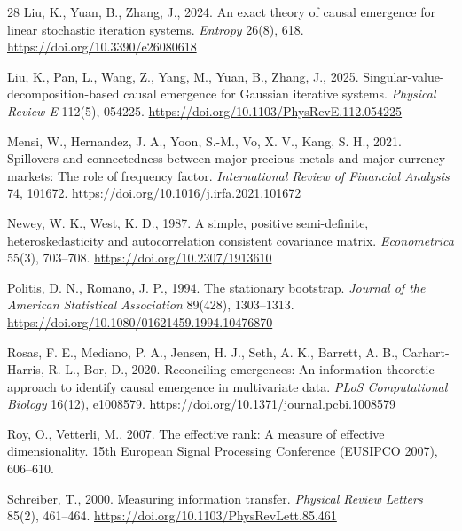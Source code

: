 \documentclass[review,12pt,authoryear]{elsarticle}
\begin{document}
\begin{thebibliography}{28}
Liu, K., Yuan, B., Zhang, J., 2024.
\newblock An exact theory of causal emergence for linear stochastic iteration systems.
\newblock \emph{Entropy} 26(8), 618. \url{https://doi.org/10.3390/e26080618}

Liu, K., Pan, L., Wang, Z., Yang, M., Yuan, B., Zhang, J., 2025.
\newblock Singular-value-decomposition-based causal emergence for Gaussian iterative systems.
\newblock \emph{Physical Review E} 112(5), 054225. \url{https://doi.org/10.1103/PhysRevE.112.054225}

Mensi, W., Hernandez, J. A., Yoon, S.-M., Vo, X. V., Kang, S. H., 2021.
\newblock Spillovers and connectedness between major precious metals and major currency markets: The role of frequency factor.
\newblock \emph{International Review of Financial Analysis} 74, 101672. \url{https://doi.org/10.1016/j.irfa.2021.101672}

Newey, W. K., West, K. D., 1987.
\newblock A simple, positive semi-definite, heteroskedasticity and autocorrelation consistent covariance matrix.
\newblock \emph{Econometrica} 55(3), 703--708. \url{https://doi.org/10.2307/1913610}

Politis, D. N., Romano, J. P., 1994.
\newblock The stationary bootstrap.
\newblock \emph{Journal of the American Statistical Association} 89(428), 1303--1313. \url{https://doi.org/10.1080/01621459.1994.10476870}

Rosas, F. E., Mediano, P. A., Jensen, H. J., Seth, A. K., Barrett, A. B., Carhart-Harris, R. L., Bor, D., 2020.
\newblock Reconciling emergences: An information-theoretic approach to identify causal emergence in multivariate data.
\newblock \emph{PLoS Computational Biology} 16(12), e1008579. \url{https://doi.org/10.1371/journal.pcbi.1008579}

Roy, O., Vetterli, M., 2007.
\newblock The effective rank: A measure of effective dimensionality.
\newblock 15th European Signal Processing Conference (EUSIPCO 2007), 606--610.

Schreiber, T., 2000.
\newblock Measuring information transfer.
\newblock \emph{Physical Review Letters} 85(2), 461--464. \url{https://doi.org/10.1103/PhysRevLett.85.461}


\end{thebibliography}
\end{document}
